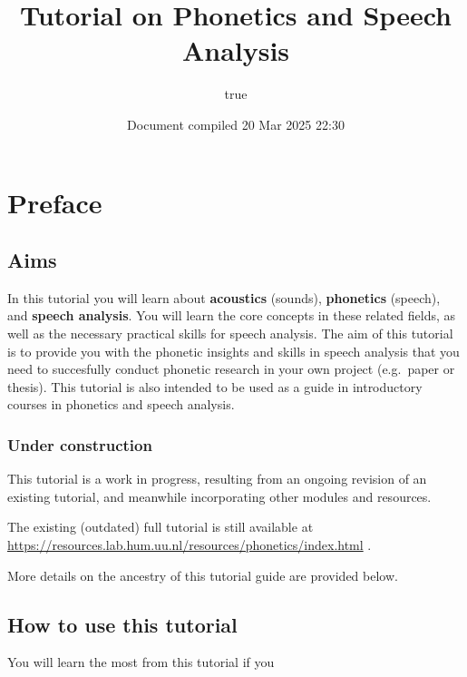 \documentclass[
]{book}
\title{Tutorial on Phonetics and Speech Analysis}
\author{true}
\date{Document compiled 20 Mar 2025 22:30}
\begin{document}
\maketitle

{
\setcounter{tocdepth}{1}
\tableofcontents
}
\chapter*{Preface}\label{preface}

\section*{Aims}\label{aims}

In this tutorial you will learn about \textbf{acoustics} (sounds), \textbf{phonetics} (speech), and \textbf{speech analysis}.
You will learn the core concepts in these related fields, as well as the necessary practical skills for speech analysis.
The aim of this tutorial is to provide you with the phonetic insights and skills in speech analysis that you need to succesfully conduct phonetic research in your own project (e.g.~paper or thesis). This tutorial is also intended to be used as a guide in introductory courses in phonetics and speech analysis.

\subsection*{Under construction}\label{under-construction}

This tutorial is a work in progress, resulting from an ongoing revision of an existing tutorial, and meanwhile incorporating other modules and resources.

The existing (outdated) full tutorial is still available at \url{https://resources.lab.hum.uu.nl/resources/phonetics/index.html}
.

More details on the ancestry of this tutorial guide are provided below.

\section*{How to use this tutorial}\label{how-to-use-this-tutorial}

You will learn the most from this tutorial if you
\end{document}
